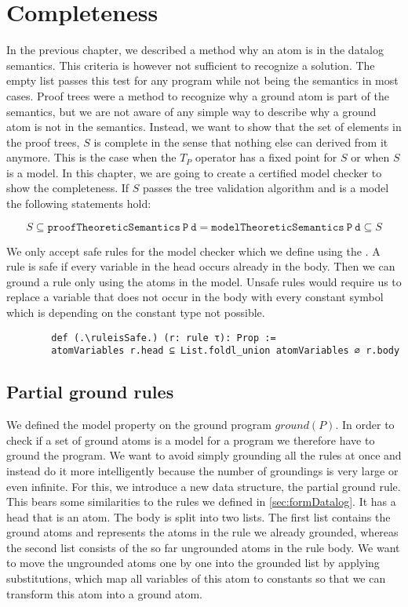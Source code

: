 \section{Completeness}\label{sec:completeness}

    In the previous chapter, we described a method why an atom is in the datalog semantics. This criteria is however not sufficient to recognize a solution. The empty list passes this test for any program while not being the semantics in most cases. Proof trees were a method to recognize why a ground atom is part of the semantics, but we are not aware of any simple way to describe why a ground atom is not in the semantics. Instead, we want to show that the set of elements in the proof trees, $S$ is complete in the sense that nothing else can derived from it anymore. This is the case when the $T_P$ operator has a fixed point for $S$ or when $S$ is a model. In this chapter, we are going to create a certified model checker to show the completeness. If $S$ passes the tree validation algorithm and is a model the following statements hold:

    \[ S \subseteq \mathtt{proofTheoreticSemantics\ P\ d} = \mathtt{modelTheoreticSemantics\ P\ d} \subseteq S \]

    We only accept safe rules for the model checker which we define using the \atomVariables. A rule is safe if every variable in the head occurs already in the body. Then we can ground a rule only using the atoms in the model. Unsafe rules would require us to replace a variable that does not occur in the body with every constant symbol which is depending on the constant type not possible.

    \begin{lstlisting}
        def (.\ruleisSafe.) (r: rule τ): Prop := 
        atomVariables r.head ⊆ List.foldl_union atomVariables ∅ r.body

    \end{lstlisting}

    \subsection{Partial ground rules}
    
        We defined the model property on the ground program $ground(P)$. In order to check if a set of ground atoms is a model for a program we therefore have to ground the program. We want to avoid simply grounding all the rules at once and instead do it more intelligently because the number of groundings is very large or even infinite.  For this, we introduce a new data structure, the partial ground rule. This bears some similarities to the rules we defined in \cref{sec:formDatalog}. It has a head that is an atom. The body is split into two lists. The first list contains the ground atoms and represents the atoms in the rule we already grounded, whereas the second list consists of the so far ungrounded atoms in the rule body. We want to move the ungrounded atoms one by one into the grounded list by applying substitutions, which map all variables of this atom to constants so that we can transform this atom into a ground atom.

